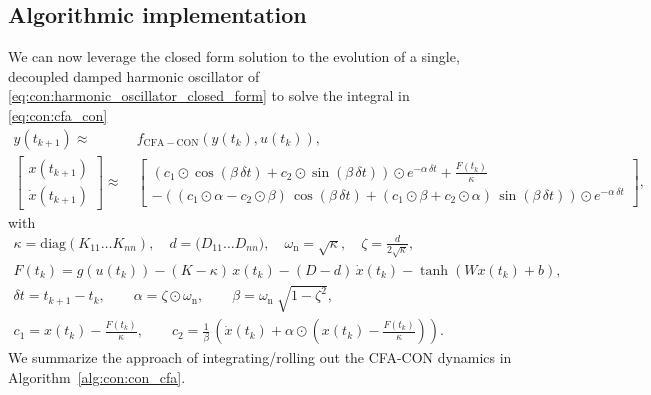 \subsection{Algorithmic implementation}
We can now leverage the closed form solution to the evolution of a single, decoupled damped harmonic oscillator of \eqref{eq:con:harmonic_oscillator_closed_form} to solve the integral in \eqref{eq:con:cfa_con}
\begin{equation}\label{eq:con:cfa:full_con_cfa_dynamics}
\begin{split}
    y(t_{k+1}) \approx& \: f_\mathrm{CFA-CON}(y(t_k), u(t_k)),\\
    \begin{bmatrix}
        x(t_{k+1})\\ \dot{x}(t_{k+1})
    \end{bmatrix} \approx& \: \begin{bmatrix}
        \left ( c_{1} \odot \cos(\beta \, \delta t) +  c_{2} \odot \sin(\beta \, \delta t) \right ) \odot e^{-\alpha \, \delta t} + \frac{F(t_k)}{\kappa}\\
        -\left ( (c_{1} \odot \alpha - c_{2} \odot \beta) \, \cos(\beta \, \delta t) +  (c_{1} \odot \beta + c_{2} \odot \alpha) \, \sin(\beta \, \delta t) \right ) \odot e^{-\alpha \, \delta t}
    \end{bmatrix},
\end{split}
\end{equation}
with
\begin{equation}
\begin{split}
    \kappa = \mathrm{diag}(K_{11} \dots K_{nn}), \quad d = \mathrm(D_{11} \dots D_{nn}), \quad \omega_\mathrm{n} = \sqrt{\kappa}, \quad \zeta = \frac{d}{2 \sqrt{\kappa}},\\
    F(t_k) = g(u(t_k)) - (K - \kappa) \, x(t_k) - (D-d) \, \dot{x}(t_k) - \tanh \left (Wx(t_k)+b \right ),\\
    \delta t = t_{k+1} - t_k, \qquad \alpha = \zeta \odot \omega_\mathrm{n}, \qquad \beta = \omega_\mathrm{n} \: \sqrt{1-\zeta^2},\\
    c_{1} = x(t_k) - \frac{F(t_k)}{\kappa}, \qquad
    c_{2} = \frac{1}{\beta} \, \left ( \dot{x}(t_k) + \alpha \odot \left (x(t_k) - \frac{F(t_k)}{\kappa} \right ) \right ).
\end{split}
\end{equation}
We summarize the approach of integrating/rolling out the \gls{CFA-CON} dynamics in Algorithm~\ref{alg:con:con_cfa}.


